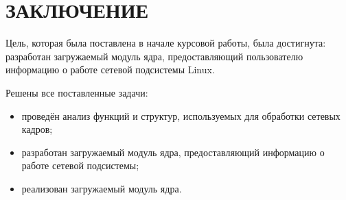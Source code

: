 \chapter*{ЗАКЛЮЧЕНИЕ}

Цель, которая была поставлена в начале курсовой работы, была достигнута: разработан загружаемый модуль ядра, предоставляющий пользователю информацию о работе сетевой подсистемы Linux.

Решены все поставленные задачи:
\begin{itemize}[label=---]
	\item проведён анализ функций и структур, используемых для обработки сетевых кадров;
	\item разработан загружаемый модуль ядра, предоставляющий информацию о работе сетевой подсистемы;
	\item реализован загружаемый модуль ядра.
\end{itemize}
